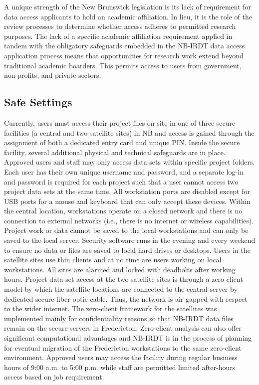 A unique strength of the New Brunswick legislation is its lack of requirement for data access applicants to hold an academic affiliation. In lieu, it is the role of the review processes to determine whether access adheres to permitted research purposes. The lack of a specific academic affiliation requirement applied in tandem with the obligatory safeguards embedded in the NB-IRDT data access application process means that opportunities for research work extend beyond traditional academic boarders. This permits access to users from government, non-profits, and private sectors.

\hypertarget{nbirdt-safesettings}{%
\subsection{Safe Settings}\label{nbirdt-safesettings}}

Currently, users must access their project files on site in one of three secure facilities (a central and two satellite sites) in NB and access is gained through the assignment of both a dedicated entry card and unique PIN. Inside the secure facility, several additional physical and technical safeguards are in place. Approved users and staff may only access data sets within specific project folders. Each user has their own unique username and password, and a separate log-in and password is required for each project such that a user cannot access two project data sets at the same time. All workstation ports are disabled except for USB ports for a mouse and keyboard that can only accept these devices. Within the central location, workstations operate on a closed network and there is no connection to external networks (i.e., there is no internet or wireless capabilities). Project work or data cannot be saved to the local workstations and can only be saved to the local server. Security software runs in the evening and every weekend to ensure no data or files are saved to local hard drives or desktops. Users in the satellite sites use thin clients and at no time are users working on local workstations. All sites are alarmed and locked with deadbolts after working hours. Project data set access at the two satellite sites is through a zero-client model by which the satellite locations are connected to the central server by dedicated secure fiber-optic cable. Thus, the network is air gapped with respect to the wider internet. The zero-client framework for the satellites was implemented mainly for confidentiality reasons so that NB-IRDT data files remain on the secure servers in Fredericton. Zero-client analysis can also offer significant computational advantages and NB-IRDT is in the process of planning for eventual migration of the Fredericton workstations to the same zero-client environment. Approved users may access the facility during regular business hours of 9:00 a.m. to 5:00 p.m. while staff are permitted limited after-hours access based on job requirement.

